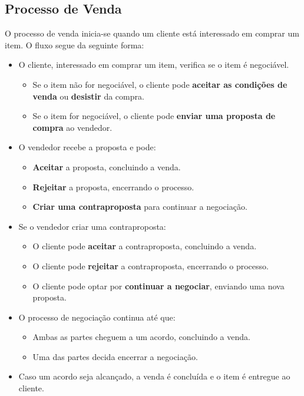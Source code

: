 \documentclass[a4paper, 12pt]{article} %
\begin{document}
\newpage
\clearpage

\subsection{Processo de Venda}
O processo de venda inicia-se quando um cliente está interessado em comprar um item. O fluxo segue da seguinte forma:

\begin{itemize}
	\item O cliente, interessado em comprar um item, verifica se o item é negociável.
	\begin{itemize}

		\item Se o item não for negociável, o cliente pode \textbf{aceitar as condições de venda} ou \textbf{desistir} da compra.
		\item Se o item for negociável, o cliente pode \textbf{enviar uma proposta de compra} ao vendedor.
	\end{itemize}
	\item O vendedor recebe a proposta e pode:
	\begin{itemize}
		\item \textbf{ Aceitar} a proposta, concluindo a venda.
		\item \textbf{Rejeitar} a proposta, encerrando o processo.
		\item \textbf{Criar uma contraproposta} para continuar a negociação.
	\end{itemize}
	\item Se o vendedor criar uma contraproposta:
	\begin{itemize}
		\item O cliente pode \textbf{aceitar} a contraproposta, concluindo a venda.
		\item O cliente pode \textbf{rejeitar} a contraproposta, encerrando o processo.
		\item O cliente pode optar por \textbf{continuar a negociar}, enviando uma nova proposta.
	\end{itemize}
	\item O processo de negociação continua até que:
	\begin{itemize}
		\item Ambas as partes cheguem a um acordo, concluindo a venda.
		\item Uma das partes decida encerrar a negociação.
	\end{itemize}
	\item Caso um acordo seja alcançado, a venda é concluída e o item é entregue ao cliente.
\end{itemize}
\end{document}
